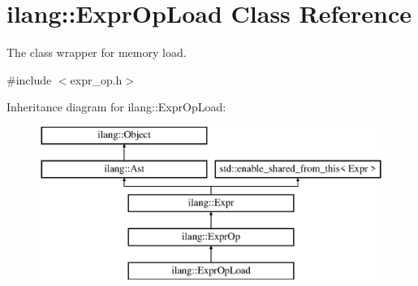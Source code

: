 \hypertarget{classilang_1_1_expr_op_load}{}\section{ilang\+:\+:Expr\+Op\+Load Class Reference}
\label{classilang_1_1_expr_op_load}


The class wrapper for memory load.  




{\ttfamily \#include $<$expr\+\_\+op.\+h$>$}

Inheritance diagram for ilang\+:\+:Expr\+Op\+Load\+:\begin{figure}[H]
\begin{center}
\leavevmode
\includegraphics[height=5.000000cm]{classilang_1_1_expr_op_load}
\end{center}
\end{figure}
